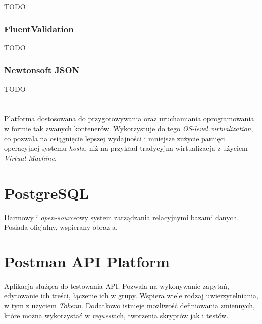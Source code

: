TODO %

\subsubsection{FluentValidation}

TODO %

\subsubsection{Newtonsoft JSON}

TODO %

\section{\docker}

\par Platforma dostosowana do przygotowywania oraz uruchamiania oprogramowania w formie tak zwanych kontenerów. Wykorzystuje do tego \emph{OS-level virtualization}, co pozwala na osiągnięcie lepszej wydajności i mniejsze zużycie pamięci operacyjnej systemu \emph{host}a, niż na przykład tradycyjna wirtualizacja z użyciem \emph{Virtual Machine}.

\section{PostgreSQL}

\par Darmowy i \emph{open-source}owy system zarządzania relacyjnymi bazami danych. Posiada oficjalny, wspierany obraz \emph{\docker}a.

\section{Postman API Platform}

\par Aplikacja służąca do testowania API. Pozwala na wykonywanie zapytań, edytowanie ich treści, łączenie ich w grupy. Wspiera wiele rodzaj uwierzytelniania, w tym z użyciem \emph{Token}u. Dodatkowo istnieje możliwość definiowania zmiennych, które można wykorzystać w \emph{request}ach, tworzenia skryptów jak i testów.